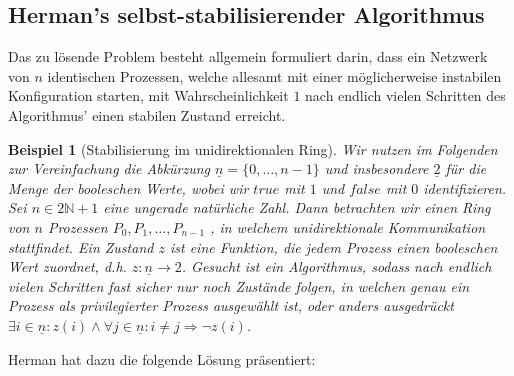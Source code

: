 \documentclass[a4paper]{article}
\newtheorem{beispiel}[satz]{Beispiel}
\theoremstyle{nonumberplain}
\begin{document}
	\subsection{Herman's selbst-stabilisierender Algorithmus}
	
	Das zu lösende Problem besteht allgemein formuliert darin, dass ein Netzwerk von $n$ identischen Prozessen, welche allesamt mit einer möglicherweise instabilen Konfiguration starten, mit Wahrscheinlichkeit $1$ nach endlich vielen Schritten des Algorithmus' einen stabilen Zustand erreicht.
	
	\begin{beispiel}[Stabilisierung im unidirektionalen Ring]
		\hspace{0.5em} Wir nutzen im Folgenden zur Vereinfachung die Abkürzung $\underline{n} = \{0,\dots,n-1\}$ und insbesondere $\underline{2}$ für die Menge der booleschen Werte, wobei wir $true$ mit $1$ und $false$ mit $0$ identifizieren.
		Sei $n \in 2\mathbb{N}+1$ eine ungerade natürliche Zahl. Dann betrachten wir einen Ring von $n$ Prozessen $P_0, P_1, \dots, P_{n-1}$ , in welchem unidirektionale Kommunikation stattfindet. Ein Zustand $z$ ist eine Funktion, die jedem Prozess einen booleschen Wert zuordnet, d.h. $z : \underline{n} \to 2$.
		Gesucht ist ein Algorithmus, sodass nach endlich vielen Schritten fast sicher nur noch Zustände folgen, in welchen genau ein Prozess als privilegierter Prozess ausgewählt ist, oder anders ausgedrückt $\exists i \in \underline{n} : z(i) \land \forall j \in \underline{n}: i\neq j \Rightarrow \neg z(i)$.
	\end{beispiel}
	
	Herman hat dazu die folgende Lösung präsentiert:
	
\end{document}
